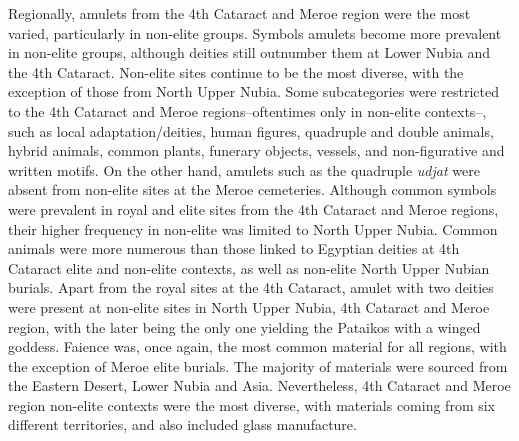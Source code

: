 Regionally, amulets from the 4th Cataract and Meroe region were the most varied, particularly in non-elite groups. Symbols amulets become more prevalent in non-elite groups, although deities still outnumber them at Lower Nubia and the 4th Cataract. Non-elite sites continue to be the most diverse, with the exception of those from North Upper Nubia. Some subcategories were restricted to the 4th Cataract and Meroe regions--oftentimes only in non-elite contexts--, such as local adaptation/deities, human figures, quadruple and double animals, hybrid animals, common plants, funerary objects, vessels, and non-figurative and written motifs. On the other hand, amulets such as the quadruple \textit{udjat} were absent from non-elite sites at the Meroe cemeteries. Although common symbols were prevalent in royal and elite sites from the 4th Cataract and Meroe regions, their higher frequency in non-elite was limited to North Upper Nubia. Common animals were more numerous than those linked to Egyptian deities at 4th Cataract elite and non-elite contexts, as well as non-elite North Upper Nubian burials. Apart from the royal sites at the 4th Cataract, amulet with two deities were present at non-elite sites in North Upper Nubia, 4th Cataract and Meroe region, with the later being the only one yielding the Pataikos with a winged goddess. Faience was, once again, the most common material for all regions, with the exception of Meroe elite burials. The majority of materials were sourced from the Eastern Desert, Lower Nubia and Asia. Nevertheless, 4th Cataract and Meroe region non-elite contexts were the most diverse, with materials coming from six different territories, and also included glass manufacture.